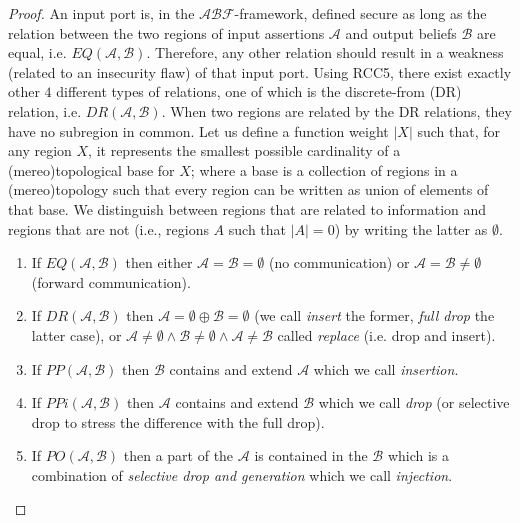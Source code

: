 \documentclass[runningheads]{llncs}
\newcommand{\assertionRegion}{\mathcal{A}}
\newcommand{\beliefRegion}{\mathcal{B}}
\newcommand{\factRegion}{\mathcal{F}}
\newcommand{\abftheory}{\assertionRegion\beliefRegion\factRegion}
\newcommand{\eq}[2]{EQ(#1,#2)}
\newcommand{\pp}[2]{PP(#1,#2)}
\newcommand{\po}[2]{PO(#1,#2)}
\newcommand{\ppi}[2]{PPi(#1,#2)}
\newcommand{\dr}[2]{DR(#1,#2)}
\begin{document}
\begin{proof}
An input port is, in the $\abftheory$-framework, defined secure as long as the relation
	between the two regions of input assertions $\assertionRegion$ and
	output beliefs $\beliefRegion$ are equal, i.e.
	$\eq{\assertionRegion}{\beliefRegion}$. Therefore, any other relation
	should result in a weakness (related to an insecurity flaw) of that
	input port.  Using RCC5, there exist exactly other $4$ different types
	of relations, one of which is the discrete-from (DR) relation, i.e.
	$\dr{\assertionRegion}{\beliefRegion}$. When two regions are related by
	the DR relations, they have no subregion in common. Let us
	define a function weight $|X|$ such that, for any region $X$, it
	represents the smallest possible cardinality of a (mereo)topological base for
	$X$; where a base is a collection of regions in a (mereo)topology such that
	every region can be written as union of elements of that base. 
	We distinguish between regions that are related to information and regions that
  are not (i.e., regions $A$ such that $|A|=0$) by writing the latter as $\emptyset$.

  \begin{enumerate}
		\item If $\eq{\assertionRegion}{\beliefRegion}$ then either
			$\assertionRegion=\beliefRegion=\emptyset$ (no
			communication) or
			$\assertionRegion=\beliefRegion\neq\emptyset$ (forward
			communication).
		\item If $\dr{\assertionRegion}{\beliefRegion}$ then
			$\assertionRegion=\emptyset\oplus\beliefRegion=\emptyset$
			(we call \emph{insert} the former, \emph{full drop}
			the latter case), or
			$\assertionRegion\neq\emptyset\wedge\beliefRegion\neq\emptyset\wedge\assertionRegion\neq\beliefRegion$
			called \emph{replace} (i.e. drop and insert).
		\item If $\pp{\assertionRegion}{\beliefRegion}$ then
			$\beliefRegion$ contains and extend $\assertionRegion$
			which we call \emph{insertion}.
		\item If $\ppi{\assertionRegion}{\beliefRegion}$ then
			$\assertionRegion$ contains and extend $\beliefRegion$
			which we call \emph{drop} (or selective drop to stress the difference with the full drop).
		\item If $\po{\assertionRegion}{\beliefRegion}$ then a part of
			the $\assertionRegion$ is contained in the
			$\beliefRegion$ which is a combination of
			\emph{selective drop and generation} which we call \emph{injection}.
	\end{enumerate}
\end{proof}
\end{document}
